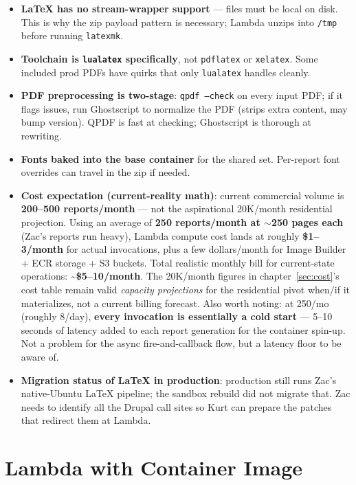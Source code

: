 \documentclass[11pt,letterpaper]{article}
\begin{document}
\begin{itemize}[nosep]
  \item \textbf{LaTeX has no stream-wrapper support} --- files must be local on disk. This is why the zip payload pattern is necessary; Lambda unzips into \texttt{/tmp} before running \texttt{latexmk}.
  \item \textbf{Toolchain is \texttt{lualatex} specifically}, not \texttt{pdflatex} or \texttt{xelatex}. Some included prod PDFs have quirks that only \texttt{lualatex} handles cleanly.
  \item \textbf{PDF preprocessing is two-stage}: \texttt{qpdf --check} on every input PDF; if it flags issues, run Ghostscript to normalize the PDF (strips extra content, may bump version). QPDF is fast at checking; Ghostscript is thorough at rewriting.
  \item \textbf{Fonts baked into the base container} for the shared set. Per-report font overrides can travel in the zip if needed.
  \item \textbf{Cost expectation (current-reality math)}: current commercial volume is \textbf{200--500 reports/month} --- not the aspirational 20K/month residential projection. Using an average of \textbf{250 reports/month at $\sim$250 pages each} (Zac's reports run heavy), Lambda compute cost lands at roughly \textbf{\$1--3/month} for actual invocations, plus a few dollars/month for Image Builder + ECR storage + S3 buckets. Total realistic monthly bill for current-state operations: \textbf{\textasciitilde\$5--10/month}. The 20K/month figures in chapter~\ref{sec:cost}'s cost table remain valid \emph{capacity projections} for the residential pivot when/if it materializes, not a current billing forecast. Also worth noting: at 250/mo (roughly 8/day), \textbf{every invocation is essentially a cold start} --- 5--10 seconds of latency added to each report generation for the container spin-up. Not a problem for the async fire-and-callback flow, but a latency floor to be aware of.
  \item \textbf{Migration status of LaTeX in production}: production still runs Zac's native-Ubuntu LaTeX pipeline; the sandbox rebuild did not migrate that. Zac needs to identify all the Drupal call sites so Kurt can prepare the patches that redirect them at Lambda.
\end{itemize}

\newpage
\appendix

\section{Lambda with Container Image}
\label{app:lambda}
\end{document}
